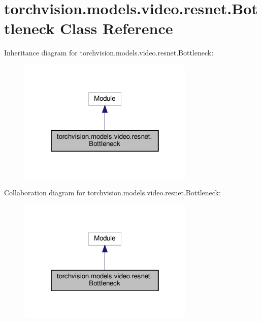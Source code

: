 \hypertarget{classtorchvision_1_1models_1_1video_1_1resnet_1_1Bottleneck}{}\section{torchvision.\+models.\+video.\+resnet.\+Bottleneck Class Reference}
\label{classtorchvision_1_1models_1_1video_1_1resnet_1_1Bottleneck}


Inheritance diagram for torchvision.\+models.\+video.\+resnet.\+Bottleneck\+:
\nopagebreak
\begin{figure}[H]
\begin{center}
\leavevmode
\includegraphics[width=238pt]{classtorchvision_1_1models_1_1video_1_1resnet_1_1Bottleneck__inherit__graph}
\end{center}
\end{figure}


Collaboration diagram for torchvision.\+models.\+video.\+resnet.\+Bottleneck\+:
\nopagebreak
\begin{figure}[H]
\begin{center}
\leavevmode
\includegraphics[width=238pt]{classtorchvision_1_1models_1_1video_1_1resnet_1_1Bottleneck__coll__graph}
\end{center}
\end{figure}
